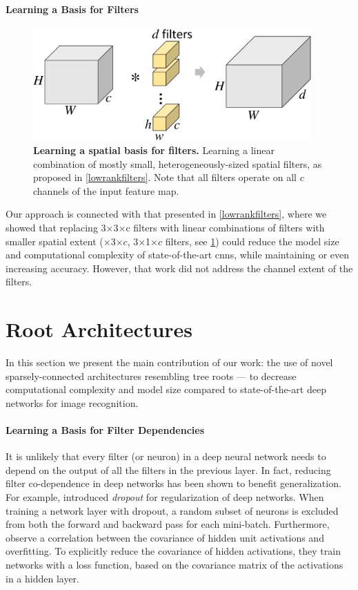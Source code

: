 \documentclass[thesis]{subfiles}
\begin{document}
	\paragraph{Learning a Basis for Filters}
	\begin{figure}[tbp]
		\centering
		\includegraphics[width=0.95\textwidth, page=3]{Figs/PDF/sparsification}
		\caption[Learning a spatial basis for filters]{\textbf{Learning a spatial basis for filters.} Learning a linear combination of mostly small, heterogeneously-sized spatial filters, as proposed in \cref{lowrankfilters}. Note that all filters operate on all $c$ channels of the input feature map.}
		\label{fig:spatialbasis}
	\end{figure}
	Our approach is connected with that presented in \cref{lowrankfilters}, where we showed that replacing 3$\times$3$\times$c filters with linear combinations of filters with smaller spatial extent ($\times$3$\times c$, 3$\times$1$\times c$ filters, see \cref{fig:spatialbasis}) could reduce the model size and computational complexity of state-of-the-art \glspl{cnn}, while maintaining or even increasing accuracy. However, that work did not address the channel extent of the filters.
	\section{Root Architectures}
	\label{method}
	In this section we present the main contribution of our work: the use of novel sparsely-connected architectures resembling tree roots --- to decrease computational complexity and model size compared to state-of-the-art deep networks for image recognition.
	
	\paragraph{Learning a Basis for Filter Dependencies}
	It is unlikely that every filter (or neuron) in a deep neural network needs to depend on the output of all the filters in the previous layer. In fact, reducing filter co-dependence in deep networks has been shown to benefit generalization. For example, \citet{Hinton2012} introduced {\em dropout} for regularization of deep networks. When training a network layer with dropout, a random subset of neurons is excluded from both the forward and backward pass for each mini-batch.  Furthermore, \citet{Cogswell2016} observe a correlation between the covariance of hidden unit activations and overfitting. To explicitly reduce the covariance of hidden activations, they train networks with a loss function, based on the covariance matrix of the activations in a hidden layer. 
	
\end{document}
